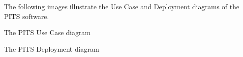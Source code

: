 The following images illustrate the Use Case and Deployment diagrams of the P\+I\+TS software.

The P\+I\+TS Use Case diagram  

The P\+I\+TS Deployment diagram  